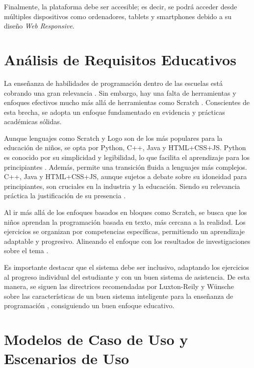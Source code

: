 Finalmente, la plataforma debe ser accesible; es decir, se podrá acceder desde múltiples dispositivos como ordenadores, tablets y smartphones debido a su diseño \textit{Web Responsive}.

\section{Análisis de Requisitos Educativos}

La enseñanza de habilidades de programación dentro de las escuelas está cobrando una gran relevancia \cite{teachingcodingchildren}. Sin embargo, hay una falta de herramientas y enfoques efectivos mucho más allá de herramientas como Scratch \cite{teachingcodingchildren}. Conscientes de esta brecha, se adopta un enfoque fundamentado en evidencia y prácticas académicas sólidas. 

Aunque lenguajes como Scratch y Logo son de los más populares para la educación de niños, se opta por Python, C++, Java y HTML+CSS+JS. Python es conocido por su simplicidad y legibilidad, lo que facilita el aprendizaje para los principiantes \cite{pears2007}. Además, permite una transición fluida a lenguajes más complejos. C++, Java y HTML+CSS+JS, aunque sujetos a debate sobre su idoneidad para principiantes, son cruciales en la industria y la educación. Siendo su relevancia práctica la justificación de su presencia \cite{dewarschonberg}.

Al ir más allá de los enfoques basados en bloques como Scratch, se busca que los niños aprendan la programación basada en texto, más cercana a la realidad. Los ejercicios se organizan por competencias específicas, permitiendo un aprendizaje adaptable y progresivo. Alineando el enfoque con los resultados de investigaciones sobre el tema \cite{document2010}. 

Es importante destacar que el sistema debe ser inclusivo, adaptando los ejercicios al progreso individual del estudiante y con un buen sistema de asistencia. De esta manera, se siguen las directrices recomendadas por Luxton-Reily y Wünsche sobre las características de un buen sistema inteligente para la enseñanza de programación \cite{intelligentturoingprogrammingeducation}, consiguiendo un buen enfoque educativo.

\section{Modelos de Caso de Uso y Escenarios de Uso} \label{sec:casodeuso}

